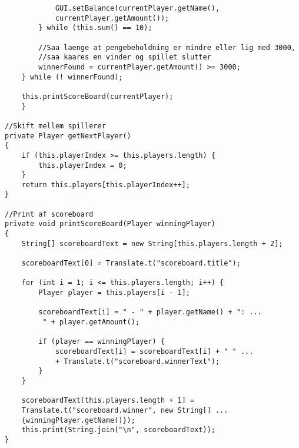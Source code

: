 \begin{lstlisting}
            GUI.setBalance(currentPlayer.getName(),
            currentPlayer.getAmount());
        } while (this.sum() == 10);
        
        //Saa laenge at pengebeholdning er mindre eller lig med 3000,
        //saa kaares en vinder og spillet slutter
        winnerFound = currentPlayer.getAmount() >= 3000;
    } while (! winnerFound);

    this.printScoreBoard(currentPlayer);
    }
            
//Skift mellem spillerer
private Player getNextPlayer()
{
    if (this.playerIndex >= this.players.length) {
        this.playerIndex = 0;
    }
    return this.players[this.playerIndex++];
}

//Print af scoreboard
private void printScoreBoard(Player winningPlayer)
{
    String[] scoreboardText = new String[this.players.length + 2];

    scoreboardText[0] = Translate.t("scoreboard.title");

    for (int i = 1; i <= this.players.length; i++) {
        Player player = this.players[i - 1];

        scoreboardText[i] = " - " + player.getName() + ": ...
         " + player.getAmount();

        if (player == winningPlayer) {
            scoreboardText[i] = scoreboardText[i] + " " ...
            + Translate.t("scoreboard.winnerText");
        }
    }

    scoreboardText[this.players.length + 1] =
    Translate.t("scoreboard.winner", new String[] ...
    {winningPlayer.getName()});
    this.print(String.join("\n", scoreboardText));
}
\end{lstlisting}
\vspace{2ex}

